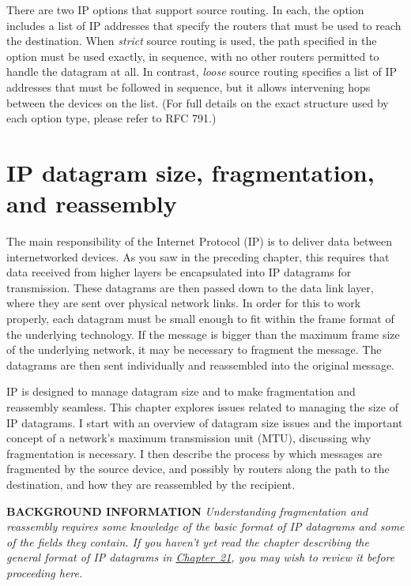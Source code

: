 \documentclass[b5paper,11pt]{memoir}
\begin{document}
There are two IP options that support source routing. In each, the
option includes a list of IP addresses that specify the routers that
must be used to reach the destination. When {\emph{strict}} source
routing is used, the path specified in the option must be used exactly,
in sequence, with no other routers permitted to handle the datagram at
all. In contrast, {\emph{loose}} source routing specifies a list of IP
addresses that must be followed in sequence, but it allows intervening
hops between the devices on the list. (For full details on the exact
structure used by each option type, please refer to RFC 791.)



\chapter{IP datagram size, fragmentation, and reassembly}


The main responsibility of the Internet Protocol (IP) is to deliver data
between internetworked devices. As you saw in the preceding chapter,
this requires that data received from higher layers be encapsulated into
IP datagrams for transmission. These datagrams are then passed down to
the data link layer, where they are sent over physical network links. In
order for this to work properly, each datagram must be small enough to
fit within the frame format of the underlying technology. If the message
is bigger than the maximum frame size of the underlying network, it may
be necessary to fragment the message. The datagrams are then sent
individually and reassembled into the original message.

IP is designed to manage datagram size and to make fragmentation and
reassembly seamless. This chapter explores issues related to managing
the size of IP datagrams. I start with an overview of datagram size
issues and the important concept of a network's maximum transmission
unit (MTU), discussing why fragmentation is necessary. I then describe
the process by which messages are fragmented by the source device, and
possibly by routers along the path to the destination, and how they are
reassembled by the recipient.


{\textbf{BACKGROUND INFORMATION}} {\emph{Understanding fragmentation and
reassembly requires some knowledge of the basic format of IP datagrams
and some of the fields they contain. If you haven't yet read the chapter
describing the general format of IP datagrams in
\protect\hyperlink{ch21.html}{Chapter~21}, you may wish to review it
before proceeding here.}}
\end{document}
